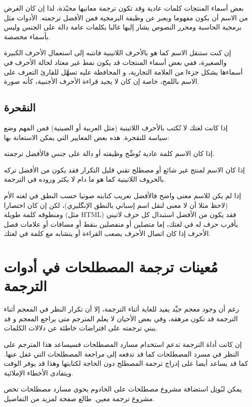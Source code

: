 بعض أسماء المنتجات كلمات عادية وقد تكون ترجمة معانيها محبّذة، لذا إن كان
الغرض من الاسم أن يكون مفهوما ويعبر عن وظيفة البرمجية فمن الأفضل
ترجمته. الأدوات مثل برمجية الحاسبة ومحرر النصوص يشار إليها غالبا بكلمات
عامة دالة على الجنس وليس بأسماء مخصصة.

إن كنت ستنقل الاسم كما هو بالأحرف اللاتينية فانتبه إلى استعمال الأحرف
الكبيرة والصغيرة، ففي بعض أسماء المنتجات قد يكون نمط غير معتاد لحالة
الأحرف في أسماءها يشكل جزءا من العلامة التجارية، و المحافظة عليه تسهَّل
للقارئ التعرف على الاسم باللمح، خاصة إن كان لا يجيد قراءة الأحرف
الأجنبية، كأنه صورة.

\subsection[ref:20221205]{النقحرة}
إذا كانت لغتك لا تُكتب بالأحرف
اللاتينية (مثل العربية أو الصينية) فمن المهم وضع سياسة للنقحرة. هذه بعض
المعايير التي يمكن الاستعانة بها:

\startitemize[1]
\item إذا كان الاسم كلمة عادية تُوضِّح وظيفته أو دالة على جنس فالأفضل
ترجمته.
\item إذا كان الاسم لمنتج غير شائع أو مصطلح تقني قليل التكرار فقد يكون
من الأفضل تركه بالحروف اللاتينية كما هو ما دام لا يكثر وروده في
الترجمة.
\item إذا لم يكن للاسم معنى واضح فالأفضل تعريب كتابته صوتيا حسب النطق في
لغته الأم (لاحظ مثلا أن لا معنى لنقل اسم إسباني بالنطق الإنگليزي)، لكن
إن كان اختصارا ومنطوقه كلمة طويلة (مثل HTML) فقد يكون من الأفضل استبدال
كل حرف لاتيني بأقرب حرف له في لغتك، إما متصلين أو منفصلين بنقط أو
مسافات أو علامات فصل الأحرف إذا كان اتصال الأحرف يصعب القراءة أو يتشابه
مع كلمة في لغتك.
\stopitemize
\section{مُعينات ترجمة المصطلحات في أدوات الترجمة}
رغم أن وجود معجم جيِّد يفيد للغاية أثناء الترجمة، إلا أن تكرار النظر في
المعجم أثناء الترجمة قد تكون مرهقة، وفي بعض الأحيان لا يعلم المترجم متى
يراجع المعجم و قد يبني ترجمته على افتراضات خاطئة عن دلالات الكلمات.

إن كانت أداة الترجمة تدعم استخدام مسارد المصطلحات فسيساعد هذا المترجم
على النظر في مسرد المصطلحات كما قد تدفعه إلى مراجعة المصطلحات التي غفل
عنها. كما قد يساعد أيضا على إدراج ترجمة المصطلح دون الحاجة لكتابتها
وهذا قد يوفر الوقت ويتفادى الأخطاء الإملائية.

يمكن لبُوتِل استضافة مشروع مصطلحات على الخادوم يحوي مسارد مصطلحات تخص
مشروع ترجمة معين. طالع صفحة \at[ref:20355427] لمزيد من
التفاصيل.

